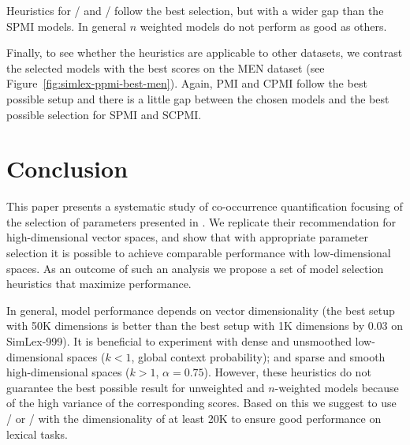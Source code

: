 \documentclass[11pt]{article}
\begin{document}
Heuristics for \logNCPMI/ and \CPMI/ follow the best selection, but with a wider gap than the SPMI models. In general $n$ weighted models do not perform as good as others.

Finally, to see whether the heuristics are applicable to other datasets, we contrast the selected models with the best scores on the MEN dataset (see Figure~\ref{fig:simlex-ppmi-best-men}). Again, PMI and CPMI follow the best possible setup and there is a little gap between the chosen models and the best possible selection for SPMI and SCPMI.

\section{Conclusion}
\label{sec:conclusion}

This paper presents a systematic study of co-occurrence quantification focusing of the selection of parameters presented in . We replicate their recommendation for high-dimensional vector spaces, and show that with appropriate parameter selection it is possible to achieve comparable performance with low-dimensional spaces. As an outcome of such an analysis we propose a set of model selection heuristics that maximize performance.

In general, model performance depends on vector dimensionality (the best setup with 50K dimensions is better than the best setup with 1K dimensions by 0.03 on SimLex-999). It is beneficial to experiment with dense and unsmoothed low-dimensional spaces ($k < 1$, global context probability); and sparse and smooth high-dimensional spaces ($k > 1$, $\alpha = 0.75$). However, these heuristics do not guarantee the best possible result for unweighted and $n$-weighted models because of the high variance of the corresponding scores. Based on this we suggest to use \logNSPMI/ or \logNSCPMI/ with the dimensionality of at least 20K to ensure good performance on lexical tasks.

%
% 

\balance

\end{document}
